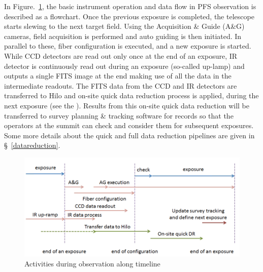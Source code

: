 \documentclass[a4paper,notitlepage]{article}
\begin{document}
In Figure.~\ref{fig:sciops-scireq-slide-oneexp}, the basic instrument
operation and data flow in PFS observation is described as a
flowchart. Once the previous exposure is completed, the telescope starts
slewing to the next target field. Using the Acquisition \& Guide (A\&G)
cameras, field acquisition is performed and auto guiding is then
initiated. In parallel to these, fiber configuration is executed, and a
new exposure is started. While CCD detectors are read out only once at
the end of an exposure, IR detector is continuously read out during an
exposure (so-called up-lamp) and outputs a single FITS image at the end
making use of all the data in the intermediate readouts. The FITS data
from the CCD and IR detectors are transferred to Hilo and on-site quick
data reduction process is applied, during the next exposure (see the
). Results from this on-site quick data reduction will be transferred to
survey planning \& tracking software for records so that the operators
at the summit can check and consider them for subsequent exposures. Some
more details about the quick and full data reduction pipelines are given
in \S~\ref{datareduction}.

\begin{figure}[htb]
  \begin{center}
    \includegraphics[width=.75\linewidth]{sciops-scireq-slide-oneexp.png}
  \end{center}
  \caption{Activities during observation along timeline}
  \label{fig:sciops-scireq-slide-oneexp}
\end{figure}

%
\end{document}
